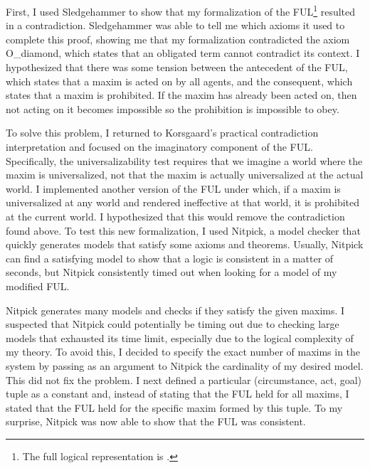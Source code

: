 \begin{isabellebody}
\begin{isamarkuptext}
First, I used Sledgehammer to show that my formalization of the FUL\footnote{The full logical representation is .}
resulted in a contradiction. Sledgehammer was able to tell me which axioms it used to complete 
this proof, showing me that my formalization contradicted the axiom O\_diamond, which states that an 
obligated term cannot contradict its context. I hypothesized that there was some tension between 
the antecedent of the FUL, which states that a maxim is acted on by all agents, and the consequent, 
which states that a maxim is prohibited. If the maxim has already been acted on, then not acting on it
becomes impossible so the prohibition is impossible to obey.

To solve this problem, I returned to Korsgaard's practical contradiction interpretation and focused 
on the imaginatory component of the FUL. Specifically, the universalizability test requires that we imagine 
a world where the maxim is universalized, not that the maxim is actually universalized at the actual world. 
I implemented another version of the FUL under which, if a maxim is universalized at any world and rendered
ineffective at that world, it is prohibited at the current world. I hypothesized that this would remove 
the contradiction found above. To test this new formalization, I used Nitpick, a model checker that 
quickly generates models that satisfy some axioms and theorems. Usually, Nitpick can find a satisfying 
model to show that a logic is consistent in a matter of seconds, but Nitpick consistently timed out 
when looking for a model of my modified FUL. 

Nitpick generates many models and checks if they satisfy the given maxims. I suspected that Nitpick 
could potentially be timing out due to checking large models that exhausted its 
time limit, especially due to the logical complexity of my theory. To avoid this, I decided to specify the exact number of maxims 
in the system by passing as an argument to Nitpick the cardinality of my desired model. This did not 
fix the problem. I next defined a particular (circumstance, act, goal) tuple as a constant and, instead of
stating that the FUL held for all maxims, I stated that the FUL held for the specific maxim formed by this tuple.
To my surprise, Nitpick was now able to show that the FUL was consistent.


\end{isamarkuptext}
\end{isabellebody}

